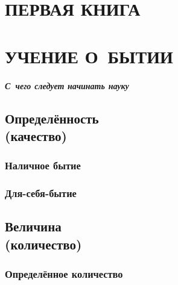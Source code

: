 \documentclass[a5paper, 10pt, twoside, onecolumn, openany]{memoir}
\begin{document}

\part[УЧЕНИЕ О~БЫТИИ]%
     {\ \\\vspace{10mm}\Large\mdseries ПЕРВАЯ КНИГА\\\ \\
      \LARGE\bfseries УЧЕНИЕ О~БЫТИИ}
\addtocspace{2mm}

\subsubsection{С~чего следует начинать науку}


\chapter[Определённость (качество)]{Определённость\\(качество)}



\section{Наличное бытие}


\section{Для-себя-бытие}


\chapter[Величина (количество)]{Величина\\(количество)}



\section{Определённое количество}

\end{document}
